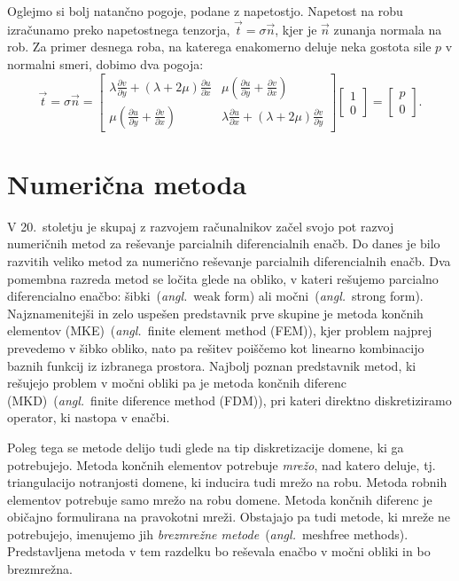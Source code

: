 \documentclass[a4paper,twoside]{article}
\theoremstyle{definition} %
\theoremstyle{plain} %
\numberwithin{equation}{section}
\newcommand{\dpar}[2]{\ensuremath{\frac{\partial #1}{\partial #2}}}
\newcommand{\vt}{\vec{t}}
\newcommand{\vn}{\vec{n}}
\newcommand{\ts}{\sigma}
\newcommand{\ang}[1]{(\textit{angl.}\ #1)}
\begin{document}
Oglejmo si bolj natančno pogoje, podane z napetostjo. Napetost na robu
izračunamo preko napetostnega tenzorja, $\vt = \ts\vn$, kjer je $\vn$ zunanja
normala na rob. Za primer desnega roba, na katerega enakomerno deluje neka gostota
sile $p$ v normalni smeri, dobimo dva pogoja:
\[
   \vt = \ts\vn =
  \begin{bmatrix}
    \lambda \dpar{v}{y} + (\lambda+2\mu) \dpar{u}{x} &
    \mu(\dpar{u}{y} + \dpar{v}{x}) \\
    \mu(\dpar{u}{y} + \dpar{v}{x}) &
    \lambda \dpar{u}{x} + (\lambda+2\mu) \dpar{v}{y}
  \end{bmatrix}
  \begin{bmatrix}
    1 \\ 0
  \end{bmatrix}
  =
  \begin{bmatrix}
    p \\ 0
  \end{bmatrix}.
\]

\section{Numerična metoda}
\label{sec:numericna-metoda}

V 20.~stoletju je skupaj z razvojem računalnikov začel svojo pot razvoj numeričnih
metod za reševanje parcialnih diferencialnih enačb. Do danes je bilo razvitih
veliko metod za numerično reševanje parcialnih diferencialnih enačb. Dva
pomembna razreda metod se ločita glede na obliko, v kateri rešujemo parcialno
diferencialno enačbo: šibki~\ang{weak form} ali močni~\ang{strong form}.
Najznamenitejši in zelo uspešen predstavnik prve skupine je metoda končnih
elementov (MKE)~\ang{finite element method (FEM)}, kjer problem najprej prevedemo
v šibko obliko, nato pa rešitev poiščemo kot linearno kombinacijo baznih
funkcij iz izbranega prostora. Najbolj poznan predstavnik metod, ki rešujejo
problem v močni obliki pa je metoda končnih diferenc (MKD)~\ang{finite diference
method (FDM)}, pri kateri direktno diskretiziramo operator, ki nastopa v enačbi.

Poleg tega se metode delijo tudi glede na tip diskretizacije domene, ki ga
potrebujejo. Metoda končnih elementov potrebuje \emph{mrežo}, nad katero deluje,
tj. triangulacijo notranjosti domene, ki inducira tudi mrežo na robu.
Metoda robnih elementov potrebuje samo mrežo na robu domene. Metoda končnih
diferenc je običajno formulirana na pravokotni mreži. Obstajajo pa tudi
metode, ki mreže ne potrebujejo, imenujemo jih \emph{brezmrežne
metode}~\ang{meshfree methods}. Predstavljena metoda v tem razdelku bo reševala
enačbo v močni obliki in bo brezmrežna.
\end{document}
